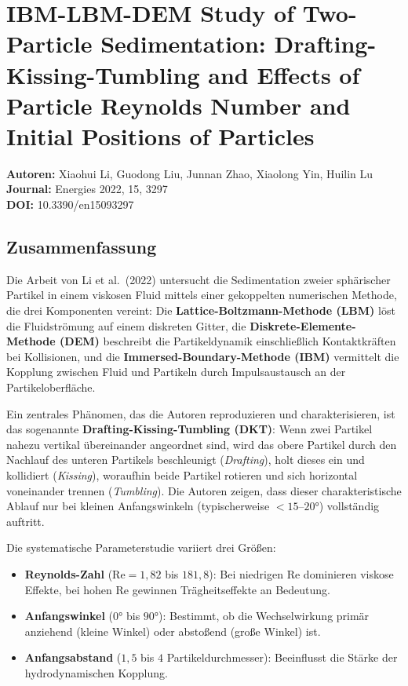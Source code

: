 \documentclass[a4paper,12pt]{article}
\begin{document}
\section*{IBM-LBM-DEM Study of Two-Particle Sedimentation: Drafting-Kissing-Tumbling and Effects of Particle Reynolds Number and Initial Positions of Particles}

\textbf{Autoren:} Xiaohui Li, Guodong Liu, Junnan Zhao, Xiaolong Yin, Huilin Lu \\
\textbf{Journal:} Energies 2022, 15, 3297 \\
\textbf{DOI:} 10.3390/en15093297

\subsection*{Zusammenfassung}

Die Arbeit von Li et al.\ (2022) untersucht die Sedimentation zweier sph\"arischer Partikel in einem viskosen Fluid mittels einer gekoppelten numerischen Methode, die drei Komponenten vereint: Die \textbf{Lattice-Boltzmann-Methode (LBM)} l\"ost die Fluidstr\"omung auf einem diskreten Gitter, die \textbf{Diskrete-Elemente-Methode (DEM)} beschreibt die Partikeldynamik einschlie{\ss}lich Kontaktkr\"aften bei Kollisionen, und die \textbf{Immersed-Boundary-Methode (IBM)} vermittelt die Kopplung zwischen Fluid und Partikeln durch Impulsaustausch an der Partikeloberfl\"ache.

Ein zentrales Ph\"anomen, das die Autoren reproduzieren und charakterisieren, ist das sogenannte \textbf{Drafting-Kissing-Tumbling (DKT)}: Wenn zwei Partikel nahezu vertikal \"ubereinander angeordnet sind, wird das obere Partikel durch den Nachlauf des unteren Partikels beschleunigt (\textit{Drafting}), holt dieses ein und kollidiert (\textit{Kissing}), woraufhin beide Partikel rotieren und sich horizontal voneinander trennen (\textit{Tumbling}). Die Autoren zeigen, dass dieser charakteristische Ablauf nur bei kleinen Anfangswinkeln (typischerweise $< 15$--$20°$) vollst\"andig auftritt.

Die systematische Parameterstudie variiert drei Gr\"o{\ss}en:
\begin{itemize}
    \item \textbf{Reynolds-Zahl} ($\mathrm{Re} = 1{,}82$ bis $181{,}8$): Bei niedrigen Re dominieren viskose Effekte, bei hohen Re gewinnen Tr\"agheitseffekte an Bedeutung.
    \item \textbf{Anfangswinkel} ($0°$ bis $90°$): Bestimmt, ob die Wechselwirkung prim\"ar anziehend (kleine Winkel) oder absto{\ss}end (gro{\ss}e Winkel) ist.
    \item \textbf{Anfangsabstand} ($1{,}5$ bis $4$ Partikeldurchmesser): Beeinflusst die St\"arke der hydrodynamischen Kopplung.
\end{itemize}
\end{document}
